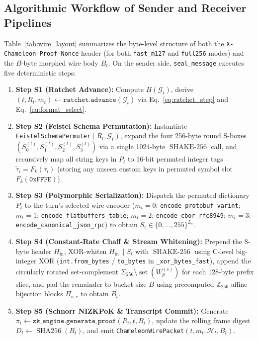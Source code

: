 \documentclass[conference,10pt]{IEEEtran}
\begin{document}
\subsection{Algorithmic Workflow of Sender and Receiver Pipelines}
Table~\ref{tab:wire_layout} summarizes the byte-level structure of both the \texttt{X-Chameleon-Proof-Nonce} header (for both \texttt{fast\_m127} and \texttt{full256} modes) and the $B$-byte morphed wire body $B_t$. On the sender side, \texttt{seal\_message} executes five deterministic steps:
\begin{enumerate}
    \item \textbf{Step S1 (Ratchet Advance):} Compute $H(\mathcal{G}_t)$, derive $(t, R_t, m_t) \leftarrow \texttt{ratchet.advance}(\mathcal{G}_t)$ via Eq.~\eqref{eq:ratchet_step} and Eq.~\eqref{eq:format_select}.
    \item \textbf{Step S2 (Feistel Schema Permutation):} Instantiate \texttt{FeistelSchemaPermuter}$(R_t, \mathcal{G}_t)$, expand the four 256-byte round S-boxes $(S_0^{(t)}, S_1^{(t)}, S_2^{(t)}, S_3^{(t)})$ via a single 1024-byte $\operatorname{SHAKE-256}$ call, and recursively map all string keys in $P_t$ to 16-bit permuted integer tags $\tilde{\tau}_i = F_k(\tau_i)$ (storing any unseen custom keys in permuted symbol slot $F_k(\mathtt{0xFFFE})$).
    \item \textbf{Step S3 (Polymorphic Serialization):} Dispatch the permuted dictionary $\tilde{P}_t$ to the turn's selected wire encoder ($m_t = 0$: \texttt{encode\_protobuf\_varint}; $m_t = 1$: \texttt{encode\_flatbuffers\_table}; $m_t = 2$: \texttt{encode\_cbor\_rfc8949}; $m_t = 3$: \texttt{encode\_canonical\_json\_rpc}) to obtain $S_t \in \{0,\dots,255\}^{L_s}$.
    \item \textbf{Step S4 (Constant-Rate Chaff \& Stream Whitening):} Prepend the 8-byte header $H_{\text{in}}$, XOR-whiten $H_{\text{in}} \parallel S_t$ with $\operatorname{SHAKE-256}$ using C-level big-integer XOR (\texttt{int.from\_bytes} / \texttt{to\_bytes} in \texttt{\_xor\_bytes\_fast}), append the circularly rotated set-complement $\Sigma_{256} \setminus \operatorname{set}(W_p^{(s)})$ for each 128-byte prefix slice, and pad the remainder to bucket size $B$ using precomputed $\mathbb{Z}_{256}$ affine bijection blocks $\Pi_{a,r}$ to obtain $B_t$.
    \item \textbf{Step S5 (Schnorr NIZKPoK \& Transcript Commit):} Generate $\pi_t \leftarrow \texttt{zk\_engine.generate\_proof}(R_t, t, B_t)$, update the rolling frame digest $D_t \leftarrow \operatorname{SHA256}(B_t)$, and emit \texttt{ChameleonWirePacket}$(t, m_t, \mathcal{H}_t, B_t)$.
\end{enumerate}
\end{document}
